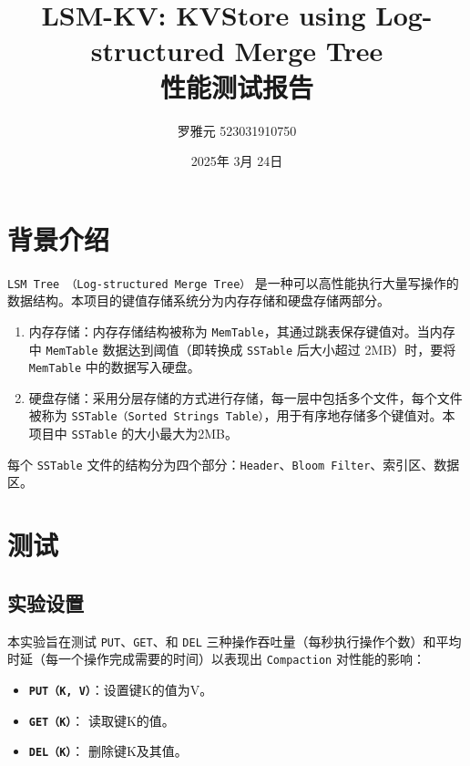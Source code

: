 \documentclass[fontset=windows]{article}
\title{LSM-KV: KVStore using Log-structured Merge Tree\\性能测试报告}
\author{罗雅元 523031910750}
\date{2025年 3月 24日}
\begin{document}
	
	\maketitle
	
	\section{背景介绍}
	
      \hspace{2em} \texttt{LSM Tree （Log-structured Merge Tree）} 是一种可以高性能执行大量写操作的数据结构。本项目的键值存储系统分为内存存储和硬盘存储两部分。
      
      \begin{enumerate}
      	\item 内存存储：内存存储结构被称为 \texttt{MemTable}，其通过跳表保存键值对。当内存中 \texttt{MemTable} 数据达到阈值（即转换成  \texttt{SSTable} 后大小超过 2MB）时，要将 \texttt{MemTable} 中的数据写入硬盘。
      	\item 硬盘存储：采用分层存储的方式进行存储，每一层中包括多个文件，每个文件被称为  \texttt{SSTable（Sorted Strings Table）}，用于有序地存储多个键值对。本项目中 \texttt{SSTable}  的大小最大为2MB。
      \end{enumerate}
      
      每个 \texttt{SSTable}  文件的结构分为四个部分：\texttt{Header}、\texttt{Bloom Filter}、索引区、数据区。
	
	\section{测试}
	
	\subsection{实验设置}
	
	\hspace{2em}本实验旨在测试 \texttt{PUT}、\texttt{GET}、和 \texttt{DEL} 三种操作吞吐量（每秒执行操作个数）和平均时延（每一个操作完成需要的时间）以表现出 \texttt{Compaction} 对性能的影响：
	
	\begin{itemize}
		\item \texttt{\textbf{PUT（K, V）}}：设置键K的值为V。
		\item \texttt{\textbf{GET（K）}}： 读取键K的值。
		\item \texttt{\textbf{DEL（K）}}： 删除键K及其值。
	\end{itemize}
	
\end{document}
